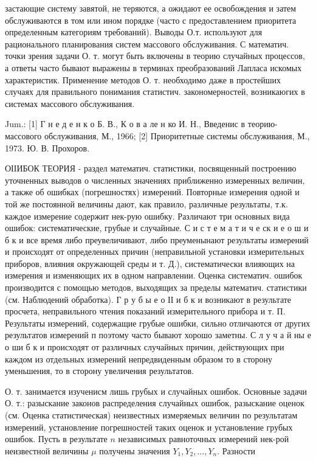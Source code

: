 \documentclass[10pt]{article}
\begin{document}
застающие систему завятой, не теряются, а ожидают ее освобождения и затем обслуживаются в том или ином порядке (часто с предоставлением приоритета определенным категориям требований). Выводы О.т. используют для рационального планирования систем массового обслуживания. С математич. точки зрения задачи О. т. могут быть включены в теорию случайных процессов, а ответы часто бывают выражены в терминах преобразований Лапласа искомых характеристик. Применение методов О. т. необходимо даже в простейших случаях для правильного понимания статистич. закономерностей, возникаюгих в системах массового обслуживания.



Jum.: [1] Г н е д е н к о Б. В., К о в а ле н ко И. Н., Введенис в теорию-массового обслуживания, М., 1966; [2] Приоритетные системы обслуживания, М., 1973. Ю. В. Прохоров.



ОІІИБОК ТЕОРИЯ - раздел математич. статистики, посвященный построению уточненных выводов о численных значениях приближенно измеренных величин, а также об ошибках (погрешностях) измерений. Повторные измерения одной и той же постоянной величины дают, как правило, различные результаты, т.к. каждое измерение содержит нек-рую ошибку. Различают три основных вида ошибок: систематические, грубые и случайные. С и с т е м а т и ч е ск и е о ш и б к и все время либо преувеличивают, либо преуменынают результаты измерений и происходят от определенных причин (неправильной установки измерительных приборов, влияния окружающей среды и т. Д.), систематически влияющих на измерения и изменяющих их в одном направлении. Оценка систематич. ошибок производится с помощью методов, выходящих за пределы математич. статистики (см. Наблюдений обработка). Г р у б ы е о ІІ и б к и возникают в результате просчета, неправильного чтения показаний измерительного прибора и т. П. Результаты измерений, содержащие грубые ошибки, сильно отличаются от других результатов измерений п поэтому часто бывают хорошо заметны. С л у ч а й ны е о ши б к и происходят от различных случайных причин, действующих при каждом из отдельных измерений непредвиденным образом то в сторону уменьшения, то в сторону увеличения результатов.



О. т. занимается изученисм лишь грубых и случайных ошибок. Основные задачи О. т.: разыскание законов распределения случайных ошибок, разыскание оценок (см. Оценка статистическая) неизвестных измеряемых величин по результатам измерений, установление погрешностей таких оценок и установление грубых ошибок. Пусть в результате $n$ независимых равноточных измерений нек-рой неизвестной величины $\mu$ получены значения $Y_{1}, Y_{2}, \ldots, Y_{n}$. Разности
\end{document}
